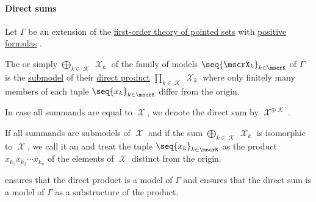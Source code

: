 \paragraph{Direct sums}

\begin{definition}\label{def:direct_sum}\mimprovised
  Let \( \Gamma \) be an extension of the \hyperref[def:pointed_set/theory]{first-order theory of pointed sets} with \hyperref[def:positive_formula]{positive formulas} .

  The  or simply  \( \bigoplus_{k \in \mscrK} \mscrX_k \) of the family of models \( \seq{ \mscrX_k }_{k \in \mscrK} \) of \( \Gamma \) is the \hyperref[def:first_order_submodel]{submodel} of their \hyperref[def:first_order_direct_product]{direct product} \( \prod_{k \in \mscrK} \mscrX_k \) where only finitely many members of each tuple \( \seq{ x_k }_{k \in \mscrK} \) differ from the origin.

  In case all summands are equal to \( \mscrX \), we denote the direct sum by \( \mscrX^{\oplus \mscrK} \).

  If all summands are submodels of \( \mscrX \) and if the sum \( \bigoplus_{k \in \mscrK} \mscrX_k \) is isomorphic to \( \mscrX \), we call it an  and treat the tuple \( \seq{ x_k }_{k \in \mscrK} \) as the product \( x_{k_1} x_{k_2} \cdots x_{k_n} \) of the elements of \( \mscrX \) distinct from the origin.
\end{definition}
\begin{defproof}
   ensures that the direct product is a model of \( \Gamma \) and  ensures that the direct sum is a model of \( \Gamma \) as a substructure of the product.
\end{defproof}

